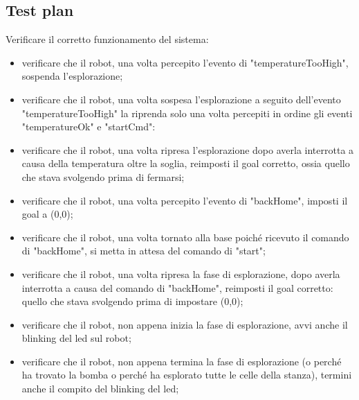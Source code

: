 \subsection{Test plan}

Verificare il corretto funzionamento del sistema:

\begin{itemize}
\item verificare che il robot, una volta percepito l'evento di "temperatureTooHigh", sospenda l'esplorazione;
\item verificare che il robot, una volta sospesa l'esplorazione a seguito dell'evento "temperatureTooHigh" la riprenda solo una volta percepiti in ordine gli eventi "temperatureOk" e "startCmd":
\item verificare che il robot, una volta ripresa l'esplorazione dopo averla interrotta a causa della temperatura oltre la soglia, reimposti il goal corretto, ossia quello che stava svolgendo prima di fermarsi;
\item verificare che il robot, una volta percepito l'evento di "backHome", imposti il goal a (0,0);
\item verificare che il robot, una volta tornato alla base poiché ricevuto il comando di "backHome", si metta in attesa del comando di "start";
\item verificare che il robot, una volta ripresa la fase di esplorazione, dopo averla interrotta a causa del comando di "backHome", reimposti il goal corretto: quello che stava svolgendo prima di impostare (0,0);
\item verificare che il robot, non appena inizia la fase di esplorazione, avvi anche il blinking del led sul robot;
\item verificare che il robot, non appena termina la fase di esplorazione (o perché ha trovato la bomba o perché ha esplorato tutte le celle della stanza), termini anche il compito del blinking del led;
\end{itemize}{}
